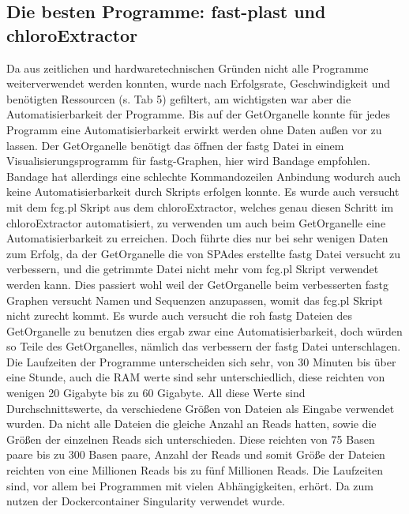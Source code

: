 \documentclass{scrartcl}
\begin{document}
\subsection{Die besten Programme: fast-plast und chloroExtractor}
\label{sec-4-5}
Da aus zeitlichen und hardwaretechnischen Gründen nicht alle Programme weiterverwendet werden konnten, wurde nach Erfolgsrate, Geschwindigkeit und benötigten Ressourcen (s. Tab 5)
gefiltert, am wichtigsten war aber die Automatisierbarkeit der Programme. Bis auf der GetOrganelle konnte für jedes Programm eine Automatisierbarkeit
erwirkt werden ohne Daten außen vor zu lassen. Der GetOrganelle benötigt das öffnen der fastg Datei in einem Visualisierungsprogramm für fastg-Graphen, hier wird Bandage empfohlen.
Bandage hat allerdings eine schlechte Kommandozeilen Anbindung wodurch auch keine Automatisierbarkeit durch Skripts erfolgen konnte.
Es wurde auch versucht mit dem fcg.pl Skript aus dem chloroExtractor, welches genau diesen Schritt im chloroExtractor automatisiert, zu verwenden um auch beim
GetOrganelle eine Automatisierbarkeit zu erreichen. Doch führte dies nur bei sehr wenigen Daten zum Erfolg, da der GetOrganelle die von SPAdes erstellte 
fastg Datei versucht zu verbessern, und die getrimmte Datei nicht mehr vom fcg.pl Skript verwendet werden kann. Dies passiert wohl weil der GetOrganelle beim verbesserten
fastg Graphen versucht Namen und Sequenzen anzupassen, womit das fcg.pl Skript nicht zurecht kommt. Es wurde auch versucht die roh fastg Dateien des GetOrganelle zu benutzen
dies ergab zwar eine Automatisierbarkeit, doch würden so Teile des GetOrganelles, nämlich das verbessern der fastg Datei unterschlagen.
Die Laufzeiten der Programme unterscheiden sich sehr, von 30 Minuten bis über eine Stunde, auch die RAM werte sind sehr unterschiedlich, diese
reichten von wenigen 20 Gigabyte bis zu 60 Gigabyte. All diese Werte sind Durchschnittswerte, da verschiedene Größen von Dateien als Eingabe verwendet wurden. Da nicht alle
Dateien die gleiche Anzahl an Reads hatten, sowie die Größen der einzelnen Reads sich unterschieden. Diese reichten von 75 Basen paare bis zu 300 Basen paare, Anzahl der Reads
und somit Größe der Dateien reichten von eine Millionen Reads bis zu fünf Millionen Reads. Die Laufzeiten sind, vor allem bei Programmen mit vielen Abhängigkeiten, erhört. Da zum nutzen
der Dockercontainer Singularity \footnotemark[49]{} verwendet wurde.    
\end{document}
